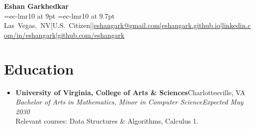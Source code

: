 \documentclass[10pt,letterpaper]{article}
\newcommand{\contact}[2]{\href{#1}{\underline{#2}}}
\begin{document}
\begin{center}
{\fontsize{24}{26}\selectfont\bfseries Eshan Garkhedkar}\\[2pt]
{\ifdefined\ResumePhone
\font\contactfont=ec-lmr10 at 9pt\def\contactsep{\hspace{1pt}|\hspace{1pt}}%
\else
\font\contactfont=ec-lmr10 at 9.7pt\def\contactsep{\;|\;}%
\fi
\contactfont\mbox{Las Vegas, NV\contactsep U.S. Citizen\contactsep\ifdefined\ResumePhone\ResumePhone\contactsep\fi\contact{mailto:eshangark@gmail.com}{eshangark@gmail.com}\contactsep\contact{https://eshangark.github.io/}{eshangark.github.io}\contactsep\contact{https://www.linkedin.com/in/eshangark/}{linkedin.com/in/eshangark}\contactsep\contact{https://github.com/eshangark}{github.com/eshangark}}}
\end{center}
\vspace{-8pt}
\section{Education}
\begin{itemize}[topsep=0pt,itemsep=4pt]
\item \textbf{University of Virginia, College of Arts \& Sciences}\hfill Charlottesville, VA\\
\textit{Bachelor of Arts in Mathematics, Minor in Computer Science}\hfill\textit{Expected May 2030}\\
Relevant courses: Data Structures \& Algorithms, Calculus 1.
\end{itemize}
\end{document}
